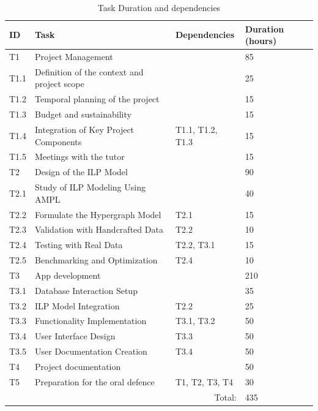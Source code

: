 \begin{table}[!ht]
\centering
\begin{tabular}{|l|l|l|l|}
\hline %
\rowcolor{black!25}
ID & Task & Dependencies & Duration (hours) \\ %
\hline
\rowcolor{black!15}
T1 & Project Management &  & 85\\\hline
T1.1 & Definition of the context and project scope & & 25\\\hline
T1.2 & Temporal planning of the project & & 15\\\hline
T1.3 & Budget and sustainability & & 15\\\hline
T1.4 & Integration of Key Project Components & T1.1, T1.2, T1.3 & 15\\\hline
T1.5 & Meetings with the tutor & & 15\\\hline
\rowcolor{black!15}
T2 & Design of the ILP Model & & 90\\\hline
T2.1 & Study of ILP Modeling Using AMPL & & 40\\\hline
T2.2 & Formulate the Hypergraph Model& T2.1 & 15\\\hline
T2.3 & Validation with Handcrafted Data & T2.2 & 10\\\hline
T2.4 & Testing with Real Data & T2.2, T3.1 & 15\\\hline
T2.5 & Benchmarking and Optimization & T2.4 & 10\\\hline
\rowcolor{black!15}
T3 & App development & & 210\\\hline
T3.1 & Database Interaction Setup & & 35\\\hline
T3.2 & ILP Model Integration & T2.2 & 25\\\hline
T3.3 & Functionality Implementation & T3.1, T3.2& 50\\\hline
T3.4 & User Interface Design & T3.3 & 50\\\hline
T3.5 & User Documentation Creation & T3.4& 50\\\hline
\rowcolor{black!15}
T4 & Project documentation  & & 50\\\hline
\rowcolor{black!15}
T5 & Preparation for the oral defence & T1, T2, T3, T4& 30\\\hline
\multicolumn{3}{r}{Total:}& \multicolumn{1}{l}{435}

\end{tabular}
\caption{Task Duration and dependencies} %
\label{tab:TaskDurationAnddependencies}
\end{table}


